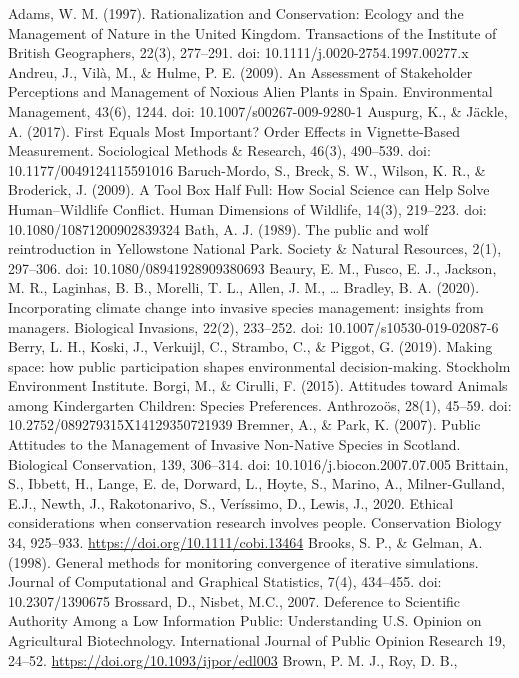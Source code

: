 \documentclass[
]{article}
\begin{document}
Adams, W. M. (1997). Rationalization and Conservation: Ecology and the
Management of Nature in the United Kingdom. Transactions of the
Institute of British Geographers, 22(3), 277--291. doi:
10.1111/j.0020-2754.1997.00277.x Andreu, J., Vilà, M., \& Hulme, P. E.
(2009). An Assessment of Stakeholder Perceptions and Management of
Noxious Alien Plants in Spain. Environmental Management, 43(6), 1244.
doi: 10.1007/s00267-009-9280-1 Auspurg, K., \& Jäckle, A. (2017). First
Equals Most Important? Order Effects in Vignette-Based Measurement.
Sociological Methods \& Research, 46(3), 490--539. doi:
10.1177/0049124115591016 Baruch-Mordo, S., Breck, S. W., Wilson, K. R.,
\& Broderick, J. (2009). A Tool Box Half Full: How Social Science can
Help Solve Human--Wildlife Conflict. Human Dimensions of Wildlife,
14(3), 219--223. doi: 10.1080/10871200902839324 Bath, A. J. (1989). The
public and wolf reintroduction in Yellowstone National Park. Society \&
Natural Resources, 2(1), 297--306. doi: 10.1080/08941928909380693
Beaury, E. M., Fusco, E. J., Jackson, M. R., Laginhas, B. B., Morelli,
T. L., Allen, J. M., \ldots{} Bradley, B. A. (2020). Incorporating
climate change into invasive species management: insights from managers.
Biological Invasions, 22(2), 233--252. doi: 10.1007/s10530-019-02087-6
Berry, L. H., Koski, J., Verkuijl, C., Strambo, C., \& Piggot, G.
(2019). Making space: how public participation shapes environmental
decision-making. Stockholm Environment Institute. Borgi, M., \& Cirulli,
F. (2015). Attitudes toward Animals among Kindergarten Children: Species
Preferences. Anthrozoös, 28(1), 45--59. doi:
10.2752/089279315X14129350721939 Bremner, A., \& Park, K. (2007). Public
Attitudes to the Management of Invasive Non-Native Species in Scotland.
Biological Conservation, 139, 306--314. doi:
10.1016/j.biocon.2007.07.005 Brittain, S., Ibbett, H., Lange, E. de,
Dorward, L., Hoyte, S., Marino, A., Milner‐Gulland, E.J., Newth, J.,
Rakotonarivo, S., Veríssimo, D., Lewis, J., 2020. Ethical considerations
when conservation research involves people. Conservation Biology 34,
925--933. \url{https://doi.org/10.1111/cobi.13464} Brooks, S. P., \&
Gelman, A. (1998). General methods for monitoring convergence of
iterative simulations. Journal of Computational and Graphical
Statistics, 7(4), 434--455. doi: 10.2307/1390675 Brossard, D., Nisbet,
M.C., 2007. Deference to Scientific Authority Among a Low Information
Public: Understanding U.S. Opinion on Agricultural Biotechnology.
International Journal of Public Opinion Research 19, 24--52.
\url{https://doi.org/10.1093/ijpor/edl003} Brown, P. M. J., Roy, D. B.,
\end{document}
